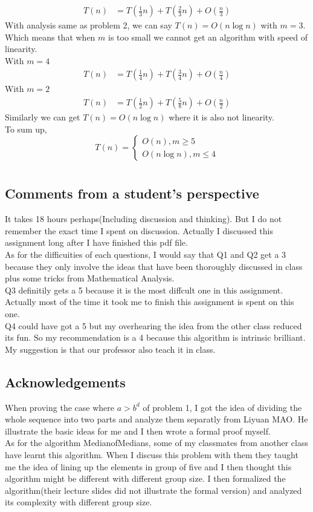 \documentclass[12pt,letterpaper]{article}
\begin{document}
\begin{align}
    T(n)&=T(\frac{1}{3}n)+T(\frac{2}{3}n)+O(\frac{n}{3})
\end{align}
With analysis same as problem 2, we can say $T(n)=O(n\log n)$ with $m=3$. Which means that when $m$ is too small we cannot get an algorithm with speed of linearity.\\
With $m=4$
\begin{align}
    T(n)&=T(\frac{1}{4}n)+T(\frac{3}{4}n)+O(\frac{n}{4})
\end{align}
With $m=2$
\begin{align}
    T(n)&=T(\frac{1}{2}n)+T(\frac{5}{8}n)+O(\frac{n}{2})
\end{align}
Similarly we can get $T(n)=O(n\log n)$ where it is also not linearity.\\
To sum up, 
$$T(n)=\begin{cases}
    O(n), m\geq 5\\
    O(n\log n), m\leq 4
\end{cases}$$
\newpage
\section{}
\subsection*{Comments from a student's perspective}
It takes 18 hours perhaps(Including discussion and thinking). But I do not remember the exact time I spent on discussion. Actually I discussed this assignment long after I have finished this pdf file.\\
As for the difficuities of each questions, I would say that Q1 and Q2 get a $3$ because they only involve the ideas that have been thoroughly discussed in class plus some tricks from Mathematical Analysis.\\
Q3 definitily gets a 5 because it is the most diffcult one in this assignment. Actually most of the time it took me to finish this assignment is spent on this one.\\
Q4 could have got a 5 but my overhearing the idea from the other class reduced its fun. So my recommendation is a 4 because this algorithm is intrinsic brilliant. My suggestion is that our professor also teach it in class.
\subsection*{Acknowledgements}
When proving the case where $a>b^d$ of problem 1, I got the idea of dividing the whole sequence into two parts and analyze them separatly from Liyuan MAO. He illustrate the basic ideas for me and I then wrote a formal proof myself.\\
As for the algorithm MedianofMedians, some of my classmates from another class have learnt this algorithm. When I discuss this problem with them they taught me the idea of lining up the elements in group of five and I then thought this algorithm might be different with different group size. I then formalized the algorithm(their lecture slides did not illustrate the formal version) and analyzed its complexity with different group size.
\end{document}
